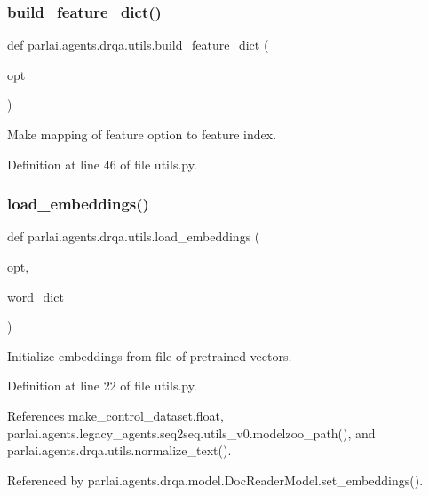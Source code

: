 \subsubsection{\texorpdfstring{build\+\_\+feature\+\_\+dict()}{build\_feature\_dict()}}
{\footnotesize\ttfamily def parlai.\+agents.\+drqa.\+utils.\+build\+\_\+feature\+\_\+dict (\begin{DoxyParamCaption}\item[{}]{opt }\end{DoxyParamCaption})}

\begin{DoxyVerb}Make mapping of feature option to feature index.\end{DoxyVerb}
 

Definition at line 46 of file utils.\+py.

\mbox{\label{namespaceparlai_1_1agents_1_1drqa_1_1utils_aa92d9906125210574825a20c75c199c8}} 
\subsubsection{\texorpdfstring{load\+\_\+embeddings()}{load\_embeddings()}}
{\footnotesize\ttfamily def parlai.\+agents.\+drqa.\+utils.\+load\+\_\+embeddings (\begin{DoxyParamCaption}\item[{}]{opt,  }\item[{}]{word\+\_\+dict }\end{DoxyParamCaption})}

\begin{DoxyVerb}Initialize embeddings from file of pretrained vectors.\end{DoxyVerb}
 

Definition at line 22 of file utils.\+py.



References make\+\_\+control\+\_\+dataset.\+float, parlai.\+agents.\+legacy\+\_\+agents.\+seq2seq.\+utils\+\_\+v0.\+modelzoo\+\_\+path(), and parlai.\+agents.\+drqa.\+utils.\+normalize\+\_\+text().



Referenced by parlai.\+agents.\+drqa.\+model.\+Doc\+Reader\+Model.\+set\+\_\+embeddings().

